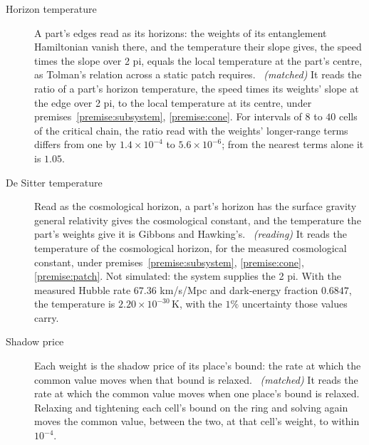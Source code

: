 \begin{description}
  \item[Horizon temperature] A part's edges read as its horizons: the weights of its entanglement Hamiltonian vanish there, and the temperature their slope gives, the speed times the slope over 2 pi, equals the local temperature at the part's centre, as Tolman's relation across a static patch requires.~\cite{BisognanoWichmann1976} \emph{(matched)} It reads the ratio of a part's horizon temperature, the speed times its weights' slope at the edge over 2 pi, to the local temperature at its centre, under premises~\ref{premise:subsystem}, \ref{premise:cone}. For intervals of $8$ to $40$ cells of the critical chain, the ratio read with the weights' longer-range terms differs from one by $1.4\times10^{-4}$ to $5.6\times10^{-6}$; from the nearest terms alone it is $1.05$.
  \item[De Sitter temperature] Read as the cosmological horizon, a part's horizon has the surface gravity general relativity gives the cosmological constant, and the temperature the part's weights give it is Gibbons and Hawking's.~\cite{GibbonsHawking1977} \emph{(reading)} It reads the temperature of the cosmological horizon, for the measured cosmological constant, under premises~\ref{premise:subsystem}, \ref{premise:cone}, \ref{premise:patch}. Not simulated: the system supplies the 2 pi. With the measured Hubble rate $67.36$ km/s/Mpc and dark-energy fraction $0.6847$, the temperature is $2.20\times10^{-30}\,\mathrm{K}$, with the $1\%$ uncertainty those values carry.
  \item[Shadow price] Each weight is the shadow price of its place's bound: the rate at which the common value moves when that bound is relaxed.~\cite{Kantorovich1960} \emph{(matched)} It reads the rate at which the common value moves when one place's bound is relaxed. Relaxing and tightening each cell's bound on the ring and solving again moves the common value, between the two, at that cell's weight, to within $10^{-4}$.
\end{description}
